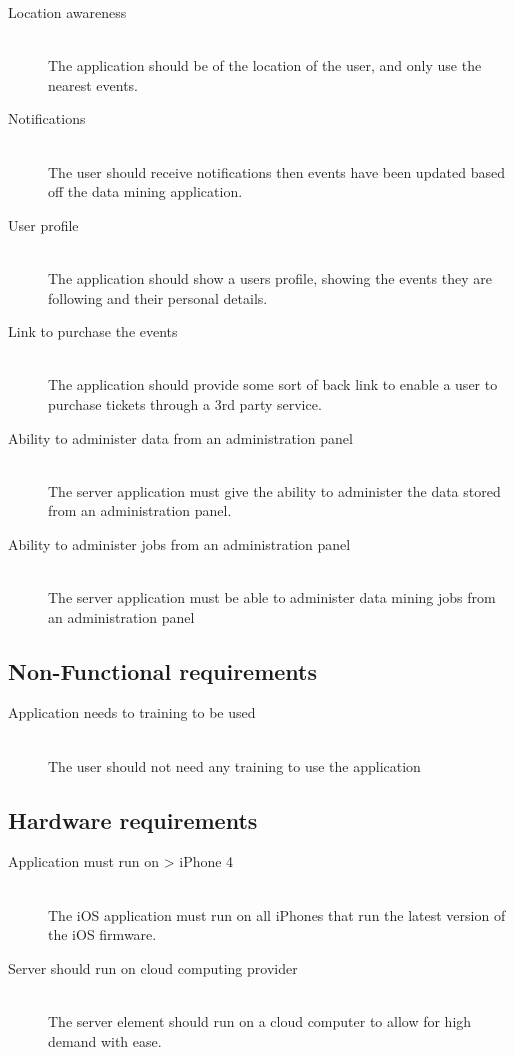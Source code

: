 		\begin{description}
			\item[Location awareness] \hfill \\
				The application should be  of the location of the user, and only use the nearest events. 
			\item[Notifications] \hfill \\
				The user should receive notifications then events have been updated based off the data mining application.
			\item [User profile] \hfill \\
				The application should show a users profile, showing the events they are following and their personal details.
			\item[Link to purchase the events] \hfill \\
				The application should provide some sort of back link to enable a user to purchase tickets through a 3rd party service. 
			\item[Ability to administer data from an administration panel] \hfill \\
				The server application must give the ability to administer the data stored from an administration panel.
			\item[Ability to administer jobs from an administration panel] \hfill \\
				The server application must be able to administer data mining jobs from an administration panel
		\end{description}

	\subsection{Non-Functional requirements}
		\begin{description}
			\item[Application needs to training to be used] \hfill \\
				The user should not need any training to use the application
				
		\end{description}

	\subsection{Hardware requirements}
		\begin{description}
			\item[Application must run on > iPhone 4] \hfill \\
				The iOS application must run on all iPhones that run the latest version of the iOS firmware.
			\item[Server should run on cloud computing provider] \hfill \\
				The server element should run on a cloud computer to allow for high demand with ease. 
		\end{description}

